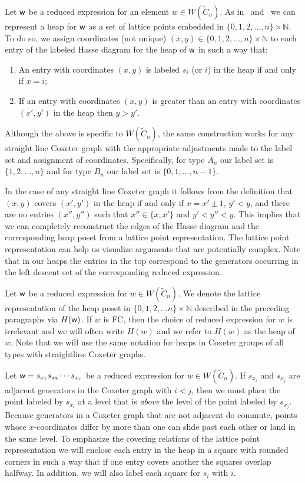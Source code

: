Let $\mathsf{w}$ be a reduced expression for an element $w \in W(\widetilde{C}_n)$. As in~\cite{Billey2007} and~\cite{Ernst2010} we can represent a heap for $\mathsf{w}$ as a set of lattice points embedded in $\{0,1,2,\ldots, n\} \times \mathbb{N}$. To do so, we assign coordinates (not unique) $(x,y) \in \{0,1,2,\ldots, n\} \times \mathbb{N}$ to each entry of the labeled Hasse diagram for the heap of $\mathsf{w}$ in such a way that:
\begin{enumerate}
\item An entry with coordinates $(x,y)$ is labeled $s_i$ (or $i$) in the heap if and only if $x = i$; 

\item If an entry with coordinates $(x,y)$ is greater than an entry with coordinates $(x',y')$ in the heap then $y > y'$.
\end{enumerate}

Although the above is specific to $W(\widetilde{C}_n)$, the same construction works for any straight line Coxeter graph with the appropriate adjustments made to the label set and assignment of coordinates. Specifically, for type $A_n$ our label set is $\{1,2, \ldots, n\}$ and for type $B_n$ our label set is $\{0,1, \ldots, n-1\}$.

In the case of any straight line Coxeter graph it follows from the definition that $(x,y)$ covers $(x',y')$ in the heap if and only if $x = x' \pm 1$, $y'< y$, and there are no entries $(x'', y'')$ such that $x'' \in \{x, x'\}$ and $y'< y'' < y$. This implies that we can completely reconstruct the edges of the Hasse diagram and the corresponding heap poset from a lattice point representation. The lattice point representation can help us visualize arguments that are potentially complex. Note that in our heaps the entries in the top correspond to the generators occurring in the left descent set of the corresponding reduced expression.

Let $\mathsf{w}$ be a reduced expression for $w \in W(\widetilde{C}_n)$. We denote the lattice representation of the heap poset in $\{0,1,2, \ldots n\} \times \mathbb{N}$ described in the preceding paragraphs via $H(\mathsf{w})$. If $w$ is $\mathrm{FC}$, then the choice of reduced expression for $w$ is irrelevant and we will often write $H(w)$ and we refer to $H(w)$ as the heap of $w$. Note that we will use the same notation for heaps in Coxeter groups of all types with straightline Coxeter graphs.

Let $\mathsf{w}=s_{x_1}s_{x_2}\cdots s_{x_r}$ be a reduced expression for $w \in W(\widetilde{C}_n)$. If $s_{x_i}$ and $s_{x_j}$ are adjacent generators in the Coxeter graph with $i<j$, then we must place the point labeled by $s_{x_i}$ at a level that is \emph{above} the level of the point labeled by $s_{x_j}$. Because generators in a Coxeter graph that are not adjacent do commute, points whose $x$-coordinates differ by more than one can slide past each other or land in the same level. To emphasize the covering relations of the lattice point representation we will enclose each entry in the heap in a square with rounded corners in such a way that if one entry covers another the squares overlap halfway. In addition, we will also label each square for $s_i$ with $i$.

